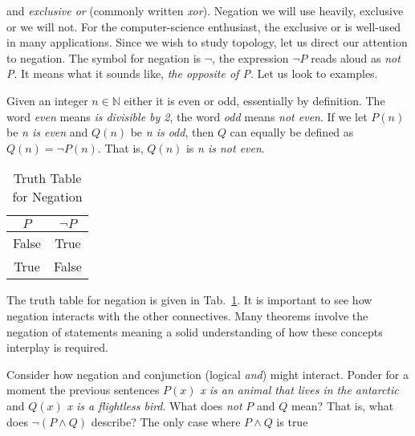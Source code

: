             and \textit{exclusive or} (commonly written \textit{xor}). Negation
            we will use heavily, exclusive or we will not. For the
            computer-science enthusiast, the exclusive or is well-used in many
            applications. Since we wish to study topology, let us direct our
            attention to negation. The symbol for negation is $\neg$, the
            expression $\neg{P}$ reads aloud as \textit{not P}. It means what it
            sounds like, \textit{the opposite of P}. Let us look to examples.
            \begin{example}
                Given an integer $n\in\mathbb{N}$ either it is even or odd,
                essentially by definition. The word \textit{even} means
                \textit{is divisible by 2}, the word \textit{odd} means
                \textit{not even}. If we let $P(n)$ be \textit{n is even} and
                $Q(n)$ be \textit{n is odd}, then $Q$ can equally be defined as
                $Q(n)=\neg{P}(n)$. That is, $Q(n)$ is \textit{n is not even}.
            \end{example}
            \begin{table}
                \centering
                \begin{tabular}{c | c }
                    $P$&$\neg{P}$\\
                    \hline
                    False&True\\
                    \hline
                    True&False
                \end{tabular}
                \caption{Truth Table for Negation}
                \label{tab:truth_table_negation}
            \end{table}
            The truth table for negation is given in
            Tab.~\ref{tab:truth_table_negation}. It is important to see how
            negation interacts with the other connectives. Many theorems
            involve the negation of statements meaning a solid understanding of
            how these concepts interplay is required.
            \par\hfill\par
            Consider how negation and conjunction (logical \textit{and}) might
            interact. Ponder for a moment the previous sentences
            $P(x)$ \textit{x is an animal that lives in the antarctic} and
            $Q(x)$ \textit{x is a flightless bird}. What does
            \textit{not} $P$ and $Q$ mean? That is, what does
            $\neg(P\land{Q})$ describe? The only case where $P\land{Q}$ is true

